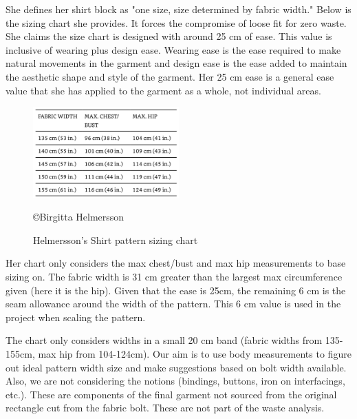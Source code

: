 She defines her shirt block as "one size, size determined by fabric width." Below is the sizing chart she provides. It forces the compromise of loose fit for zero waste. 
She claims the size chart is designed with around 25 cm of ease. This value is inclusive of wearing plus design ease. Wearing ease is the ease required to make natural movements in the garment and design ease is the ease added to maintain the aesthetic shape and style of the garment. Her 25 cm ease is a general ease value that she has applied to the garment as a whole, not individual areas. 
\begin{figure} [H] %
    \centering %
    \includegraphics[width = 0.5\textwidth]{Images/BH size chart.png} %
    \caption{Helmersson's Shirt pattern sizing chart}
    \copyright {Birgitta Helmersson} %
    \label{} %
\end{figure}
Her chart only considers the max chest/bust and max hip measurements to base sizing on. The fabric width is 31 cm greater than the largest max circumference given (here it is the hip). Given that the ease is 25cm, the remaining 6 cm is the seam allowance around the width of the pattern. This 6 cm value is used in the project when scaling the pattern.

The chart only considers widths in a small 20 cm band (fabric widths from 135-155cm, max hip from 104-124cm). Our aim is to use body measurements to figure out ideal pattern width size and make suggestions based on bolt width available. Also, we are not considering the notions (bindings, buttons, iron on interfacings, etc.). These are components of the final garment not sourced from the original rectangle cut from the fabric bolt. These are not part of the waste analysis.

